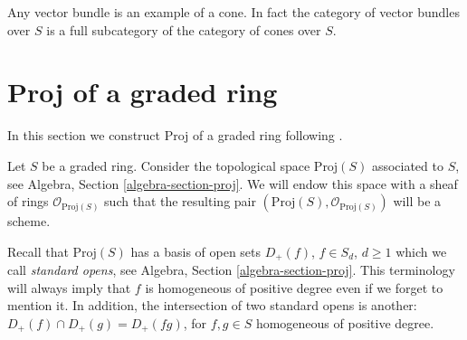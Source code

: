 \documentclass{stacks-project}
\theoremstyle{plain}
\theoremstyle{definition}
\theoremstyle{remark}
\numberwithin{equation}{subsection}
\begin{document}
\noindent
Any vector bundle is an example of a cone. In fact the category of
vector bundles over $S$ is a full subcategory of the category of cones
over $S$.










\section{Proj of a graded ring}
\label{section-proj}

\noindent
In this section we construct Proj of a graded ring
following \cite[II, Section 2]{EGA}.

\medskip\noindent
Let $S$ be a graded ring. Consider the topological space $\text{Proj}(S)$
associated to $S$, see Algebra, Section \ref{algebra-section-proj}.
We will endow this space with a sheaf of rings $\mathcal{O}_{\text{Proj}(S)}$
such that the resulting pair $(\text{Proj}(S), \mathcal{O}_{\text{Proj}(S)})$
will be a scheme.

\medskip\noindent
Recall that $\text{Proj}(S)$ has a basis of open sets $D_{+}(f)$,
$f \in S_d$, $d \geq 1$ which we call {\it standard opens}, see Algebra,
Section \ref{algebra-section-proj}. This terminology will always
imply that $f$ is homogeneous of positive degree even if we forget to
mention it. In addition, the intersection of two standard opens is another:
$D_{+}(f) \cap D_{+}(g) = D_{+}(fg)$, for $f, g \in S$ homogeneous of positive
degree.
\end{document}
